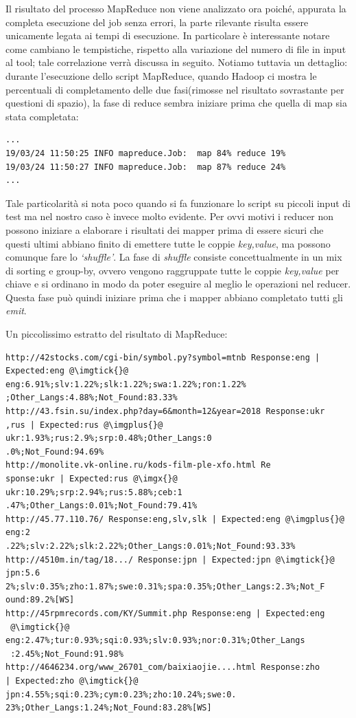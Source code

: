 \documentclass{article}
\newcommand{\MR}{MapReduce}
\begin{document}
\noindent
Il risultato del processo \MR{} non viene analizzato ora poiché, appurata la completa esecuzione del job senza errori, la parte rilevante risulta essere unicamente legata ai tempi di esecuzione. In particolare è interessante notare come cambiano le tempistiche, rispetto alla variazione del numero di file in input al tool; tale correlazione verrà discussa in seguito.
Notiamo tuttavia un dettaglio: durante l'esecuzione dello script \MR{}, quando Hadoop ci mostra le percentuali di completamento delle due fasi(rimosse nel risultato sovrastante per questioni di spazio), la fase di reduce sembra iniziare prima che quella di map sia stata completata:
\begin{verbatim}
...
19/03/24 11:50:25 INFO mapreduce.Job:  map 84% reduce 19%
19/03/24 11:50:27 INFO mapreduce.Job:  map 87% reduce 24%
...
\end{verbatim}
Tale particolarità si nota poco quando si fa funzionare lo script su piccoli input di test ma nel nostro caso è invece molto evidente. Per ovvi motivi i reducer non possono iniziare a elaborare i risultati dei mapper prima di essere sicuri che questi ultimi abbiano finito di emettere tutte le coppie \textit{\textlangle key,value\textrangle}, ma possono comunque fare lo \textit{`shuffle'}.
La fase di \textit{shuffle} consiste concettualmente in un mix di sorting e group-by, ovvero vengono raggruppate tutte le coppie \textit{\textlangle key,value\textrangle} per chiave e si ordinano in modo da poter eseguire al meglio le operazioni nel reducer. Questa fase può quindi iniziare prima che i mapper abbiano completato tutti gli \textit{emit}.

Un piccolissimo estratto del risultato di \MR{}:
\begin{verbatim}
http://42stocks.com/cgi-bin/symbol.py?symbol=mtnb Response:eng |
Expected:eng @\imgtick{}@ eng:6.91%;slv:1.22%;slk:1.22%;swa:1.22%;ron:1.22%
;Other_Langs:4.88%;Not_Found:83.33%
http://43.fsin.su/index.php?day=6&month=12&year=2018 Response:ukr
,rus | Expected:rus @\imgplus{}@ ukr:1.93%;rus:2.9%;srp:0.48%;Other_Langs:0
.0%;Not_Found:94.69%
http://monolite.vk-online.ru/kods-film-ple-xfo.html Re
sponse:ukr | Expected:rus @\imgx{}@ ukr:10.29%;srp:2.94%;rus:5.88%;ceb:1
.47%;Other_Langs:0.01%;Not_Found:79.41%
http://45.77.110.76/ Response:eng,slv,slk | Expected:eng @\imgplus{}@ eng:2
.22%;slv:2.22%;slk:2.22%;Other_Langs:0.01%;Not_Found:93.33%
http://4510m.in/tag/18.../ Response:jpn | Expected:jpn @\imgtick{}@ jpn:5.6
2%;slv:0.35%;zho:1.87%;swe:0.31%;spa:0.35%;Other_Langs:2.3%;Not_F
ound:89.2%[WS]
http://45rpmrecords.com/KY/Summit.php Response:eng | Expected:eng
 @\imgtick{}@ eng:2.47%;tur:0.93%;sqi:0.93%;slv:0.93%;nor:0.31%;Other_Langs
 :2.45%;Not_Found:91.98%
http://4646234.org/www_26701_com/baixiaojie....html Response:zho 
| Expected:zho @\imgtick{}@ jpn:4.55%;sqi:0.23%;cym:0.23%;zho:10.24%;swe:0.
23%;Other_Langs:1.24%;Not_Found:83.28%[WS]
\end{verbatim}
\end{document}
